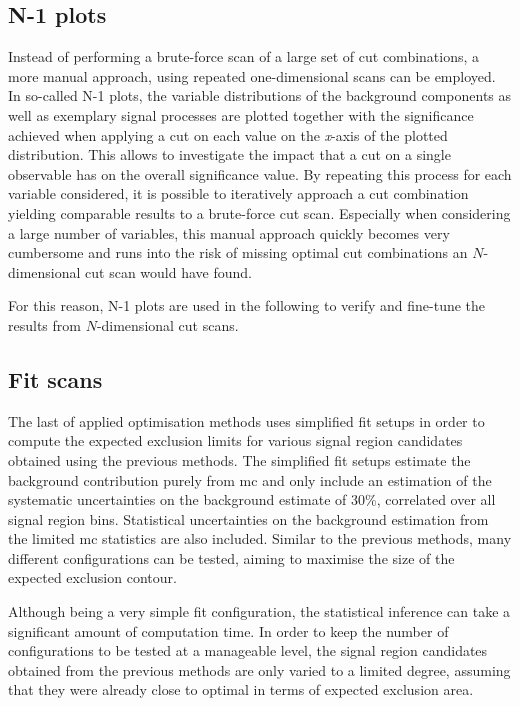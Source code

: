 \subsection{N-1 plots}\label{sec:n-1-scan}

Instead of performing a brute-force scan of a large set of cut combinations, a more manual approach, using repeated one-dimensional scans can be employed. In so-called N-1 plots, the variable distributions of the background components as well as exemplary signal processes are plotted together with the significance achieved when applying a cut on each value on the \textit{x}-axis of the plotted distribution. This allows to investigate the impact that a cut on a single observable has on the overall significance value. By repeating this process for each variable considered, it is possible to iteratively approach a cut combination yielding comparable results to a brute-force cut scan. Especially when considering a large number of variables, this manual approach quickly becomes very cumbersome and runs into the risk of missing optimal cut combinations an $N$-dimensional cut scan would have found.

For this reason, N-1 plots are used in the following to verify and fine-tune the results from $N$-dimensional cut scans.
 
\subsection{Fit scans}\label{sec:fit-scan}

The last of applied optimisation methods uses simplified fit setups in order to compute the expected exclusion limits for various signal region candidates obtained using the previous methods. The simplified fit setups estimate the background contribution purely from \gls{mc} and only include an estimation of the systematic uncertainties on the background estimate of 30\%, correlated over all signal region bins. Statistical uncertainties on the background estimation from the limited \gls{mc} statistics are also included. Similar to the previous methods, many different configurations can be tested, aiming to maximise the size of the expected exclusion contour.

Although being a very simple fit configuration, the statistical inference can take a significant amount of computation time. In order to keep the number of configurations to be tested at a manageable level, the signal region candidates obtained from the previous methods are only varied to a limited degree, assuming that they were already close to optimal in terms of expected exclusion area.


